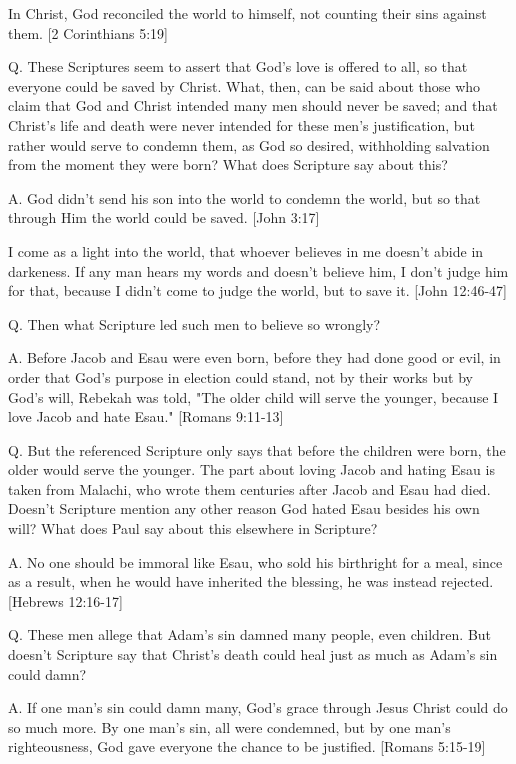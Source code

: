 \documentclass[../main.tex]{subfiles}
\begin{document}
	In Christ, God reconciled the world to himself, not counting their sins against them. [2 Corinthians 5:19]

	Q. These Scriptures seem to assert that God's love is offered to all, so that everyone could be saved by Christ. What, then, can be said about those who claim that God and Christ intended many men should never be saved; and that Christ's life and death were never intended for these men's justification, but rather would serve to condemn them, as God so desired, withholding salvation from the moment they were born?  What does Scripture say about this?

	A. God didn't send his son into the world to condemn the world, but so that through Him the world could be saved. [John 3:17]

	I come as a light into the world, that whoever believes in me doesn't abide in darkeness. If any man hears my words and doesn't believe him, I don't judge him for that, because I didn't come to judge the world, but to save it. [John 12:46-47]

	Q. Then what Scripture led such men to believe so wrongly?

	A. Before Jacob and Esau were even born, before they had done good or evil, in order that God's purpose in election could stand, not by their works but by God's will, Rebekah was told, "The older child will serve the younger, because I love Jacob and hate Esau." [Romans 9:11-13]

	Q. But the referenced Scripture only says that before the children were born, the older would serve the younger. The part about loving Jacob and hating Esau is taken from Malachi, who wrote them centuries after Jacob and Esau had died. Doesn't Scripture mention any other reason God hated Esau besides his own will? What does Paul say about this elsewhere in Scripture?

	A. No one should be immoral like Esau, who sold his birthright for a meal, since as a result, when he would have inherited the blessing, he was instead rejected. [Hebrews 12:16-17]

	Q. These men allege that Adam's sin damned many people, even children. But doesn't Scripture say that Christ's death could heal just as much as Adam's sin could damn?

	A. If one man's sin could damn many, God's grace through Jesus Christ could do so much more. By one man's sin, all were condemned, but by one man's righteousness, God gave everyone the chance to be justified. [Romans 5:15-19]
\end{document}
